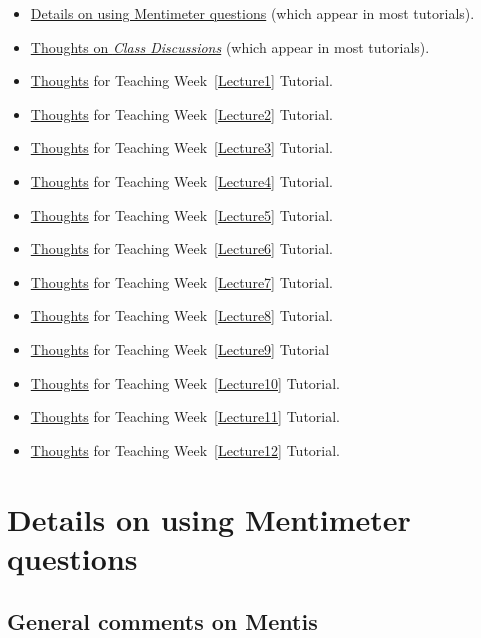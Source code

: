 \documentclass[
  11pt,
  a4paper,
  krantz2]{krantz}
\providecommand{\tightlist}{%
  \setlength{\itemsep}{0pt}\setlength{\parskip}{0pt}}
\begin{document}
\begin{itemize}
\tightlist
\item
  \hyperref[MentiQuestions]{Details on using Mentimeter questions} (which appear in most tutorials).
\item
  \hyperref[ClassDiscussions]{Thoughts on \emph{Class Discussions}} (which appear in most tutorials).
\item
  \hyperref[Lecture1ThoughtsForTutors]{Thoughts} for Teaching Week~\ref{Lecture1} Tutorial.
\item
  \hyperref[Lecture2ThoughtsForTutors]{Thoughts} for Teaching Week~\ref{Lecture2} Tutorial.
\item
  \hyperref[Lecture3ThoughtsForTutors]{Thoughts} for Teaching Week~\ref{Lecture3} Tutorial.
\item
  \hyperref[Lecture4ThoughtsForTutors]{Thoughts} for Teaching Week~\ref{Lecture4} Tutorial.
\item
  \hyperref[Lecture5ThoughtsForTutors]{Thoughts} for Teaching Week~\ref{Lecture5} Tutorial.
\item
  \hyperref[Lecture6ThoughtsForTutors]{Thoughts} for Teaching Week~\ref{Lecture6} Tutorial.
\item
  \hyperref[Lecture7ThoughtsForTutors]{Thoughts} for Teaching Week~\ref{Lecture7} Tutorial.
\item
  \hyperref[Lecture8ThoughtsForTutors]{Thoughts} for Teaching Week~\ref{Lecture8} Tutorial.
\item
  \hyperref[Lecture9ThoughtsForTutors]{Thoughts} for Teaching Week~\ref{Lecture9} Tutorial
\item
  \hyperref[Lecture10ThoughtsForTutors]{Thoughts} for Teaching Week~\ref{Lecture10} Tutorial.
\item
  \hyperref[Lecture11ThoughtsForTutors]{Thoughts} for Teaching Week~\ref{Lecture11} Tutorial.
\item
  \hyperref[Lecture12ThoughtsForTutors]{Thoughts} for Teaching Week~\ref{Lecture12} Tutorial.
\end{itemize}

\section{Details on using Mentimeter questions}\label{MentiQuestions}

\subsection{General comments on Mentis}\label{general-comments-on-mentis}
\end{document}
